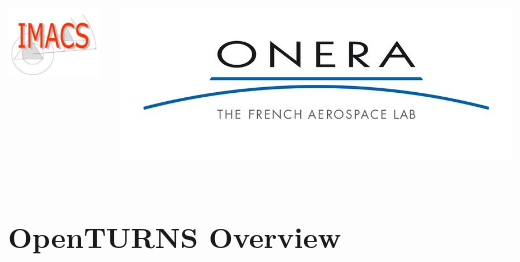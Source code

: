 \documentclass[aspectratio=169]{beamer}
\begin{document}
\begin{frame}
\begin{columns}
\begin{center}
\includegraphics[height=0.15\textheight]{figures/logo_Imacs.png}
\end{center}
  \begin{center}
\includegraphics[height=0.15\textheight]{figures/logo_ONERA.jpg}
\end{center}
  \end{columns}

  \end{frame}




\section{OpenTURNS Overview}

\end{document}
